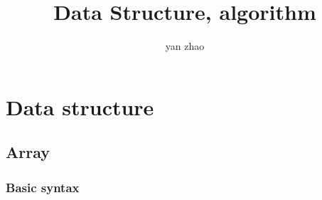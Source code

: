 \documentclass[a4paper,11pt,twoside]{book}
\begin{document}
\title{Data Structure, algorithm}
\author{yan zhao}
\date{}\maketitle

\setcounter{secnumdepth}{4}
\setcounter{tocdepth}{4}
\tableofcontents


\chapter{Data structure} 

\section{Array}
\subsection{Basic syntax}
\end{document}
